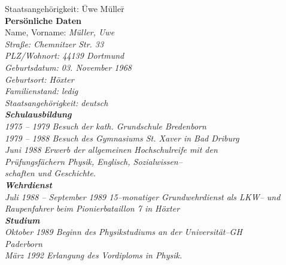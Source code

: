 \begin{tabbing}
\rm Staatsangeh\"{o}rigkeit: \hspace{2.3cm}\= Uwe
M\"{u}ller\hspace{17mm}\=\kill \\ {\large\bf Pers\"{o}nliche Daten}\\[5mm]
Name, Vorname: \> \sl M\"{u}ller, Uwe\\[3mm] \rm Stra{\ss}e: \> \sl
Chemnitzer Str. 33\\[3mm] \rm PLZ/Wohnort: \> \sl 44139
Dortmund\\[3mm] \rm Geburtsdatum: \> \sl 03. November 1968\\[3mm]
\rm Geburtsort: \> \sl H\"{o}xter\\[3mm] \rm Familienstand: \> \sl
ledig\\[3mm] \rm Staatsangeh\"{o}rigkeit: \> \sl deutsch\\[5ex]

{\large \bf Schulausbildung}\\[5mm] \rm 1975 -- 1979 \> \sl Besuch
der kath. Grundschule Bredenborn\\[3mm] \rm 1979 -- 1988 \> \sl
Besuch des Gymnasiums St. Xaver in Bad Driburg\\[3mm] \rm Juni
1988 \> \sl Erwerb der allgemeinen Hochschulreife mit den\\ \> \sl
Pr\"{u}fungsf\"{a}chern Physik, Englisch, Sozialwissen--\\ \> \sl schaften
und Geschichte.
\\[5ex]

{\large \bf Wehrdienst}\\[5mm] \rm Juli 1988 -- September 1989 \>
\sl 15--monatiger Grundwehrdienst als LKW-- und\\ \> \sl
Raupenfahrer beim Pionierbataillon 7 in H\"{o}xter\\[5ex]

{\large \bf Studium}\\[5mm] \rm Oktober 1989 \> \sl Beginn des
Physikstudiums an der Universit\"{a}t--GH\\ \> \sl Paderborn\\[3mm]
\rm M\"{a}rz 1992 \> \sl Erlangung des Vordiploms in Physik.\\[5ex]
\end{tabbing}

\thispagestyle{empty} %

